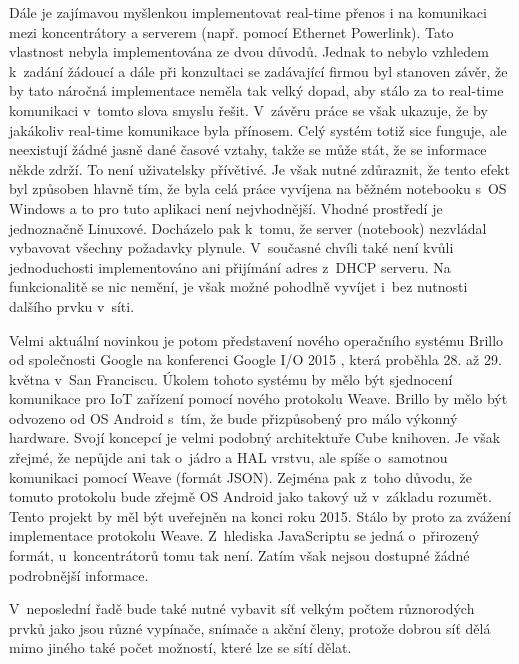 Dále je zajímavou myšlenkou implementovat real-time přenos i na komunikaci mezi koncentrátory a serverem (např. pomocí Ethernet Powerlink).  Tato vlastnost nebyla implementována ze dvou důvodů. Jednak to nebylo vzhledem k~zadání žádoucí a dále při konzultaci se zadávající firmou byl stanoven závěr, že by tato náročná implementace neměla tak velký dopad, aby stálo za to real-time komunikaci v~tomto slova smyslu řešit. V~závěru práce se však ukazuje, že by jakákoliv real-time komunikace byla přínosem. Celý systém totiž sice funguje, ale neexistují žádné jasně dané časové vztahy, takže se může stát, že se informace někde zdrží. To není uživatelsky přívětivé. Je však nutné zdůraznit, že tento efekt byl způsoben hlavně tím, že byla celá práce vyvíjena na běžném notebooku s~OS Windows a to pro tuto aplikaci není nejvhodnější. Vhodné prostředí je jednoznačně Linuxové. Docházelo pak k~tomu, že server (notebook) nezvládal vybavovat všechny požadavky plynule. V~současné chvíli také není kvůli jednoduchosti implementováno ani přijímání adres z~DHCP serveru. Na funkcionalitě se nic nemění, je však možné pohodlně vyvíjet i~bez nutnosti dalšího prvku v~síti.

Velmi aktuální novinkou je potom představení nového operačního systému Brillo  od společnosti Google na konferenci Google I/O 2015 , která proběhla 28. až 29. května v~San Franciscu. Úkolem tohoto systému by mělo být sjednocení komunikace pro IoT zařízení pomocí nového protokolu Weave.  Brillo by mělo být odvozeno od OS Android s~tím, že bude přizpůsobený pro málo výkonný hardware. Svojí koncepcí je velmi podobný architektuře Cube knihoven. Je však zřejmé, že nepůjde ani tak o~jádro a HAL vrstvu, ale spíše o~samotnou komunikaci pomocí Weave (formát JSON). Zejména pak z~toho důvodu, že tomuto protokolu bude zřejmě OS Android jako takový už v~základu rozumět. Tento projekt by měl být uveřejněn na konci roku 2015. Stálo by proto za zvážení implementace protokolu Weave. Z~hlediska JavaScriptu se jedná o~přirozený formát, u~koncentrátorů tomu tak není. Zatím však nejsou dostupné žádné podrobnější informace.

V~neposlední řadě bude také nutné vybavit síť velkým počtem růz\-no\-ro\-dých prvků jako jsou různé vypínače, snímače a akční členy, protože dobrou síť dělá mimo jiného také počet možností, které lze se sítí dělat.
